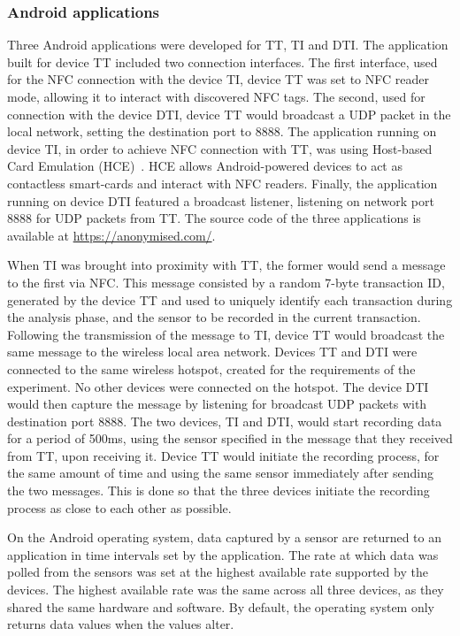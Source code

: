 \documentclass[runningheads,a4paper]{llncs}
\begin{document}
\subsubsection{Android applications}

Three Android applications were developed for TT, TI and DTI.
The application built for device TT included two connection interfaces. 
The first interface, used for the NFC connection with the device TI, device TT was set to NFC reader mode, allowing it to interact with discovered NFC tags.
The second, used for connection with the device DTI, device TT would broadcast a UDP packet in the local network, setting the destination port to 8888.
The application running on device TI, in order to achieve NFC connection with TT, was using Host-based Card Emulation (HCE)~\cite{androidhce}.
HCE allows Android-powered devices to act as contactless smart-cards and interact with NFC readers.
Finally, the application running on device DTI featured a broadcast listener, listening on network port 8888 for UDP packets from TT\@.
The source code of the three applications is available at \url{https://anonymised.com/}.

When TI was brought into proximity with TT, the former would send a message to the first via NFC\@.
This message consisted by a random 7-byte transaction ID, generated by the device TT and used to uniquely identify each transaction during the analysis phase, and the sensor to be recorded in the current transaction. Following the transmission of the message to TI, device TT would broadcast the same message to the wireless local area network.
Devices TT and DTI were connected to the same wireless hotspot, created for the requirements of the experiment.
No other devices were connected on the hotspot.
The device DTI would then capture the message by listening for broadcast UDP packets with destination port 8888.  The two devices, TI and DTI, would start recording data for a period of 500ms, using the sensor specified in the message that they received from TT, upon receiving it.
Device TT would initiate the recording process, for the same amount of time and using the same sensor immediately after sending the two messages.
This is done so that the three devices initiate the recording process as close to each other as possible.

On the Android operating system, data captured by a sensor are returned to an application in time intervals set by the application.
The rate at which data was polled from the sensors was set at the highest available rate supported by the devices.
The highest available rate was the same across all three devices, as they shared the same hardware and software.
By default, the operating system only returns data values when the values alter.
\end{document}
